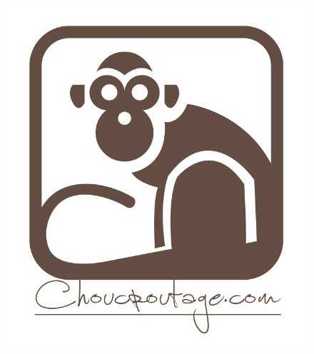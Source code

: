 \begin{figure}[h]
\begin{center}
	       		\includegraphics[scale=0.75]{images/logochoucroutage.jpg}\\
			\end{center}
			\end{figure}


